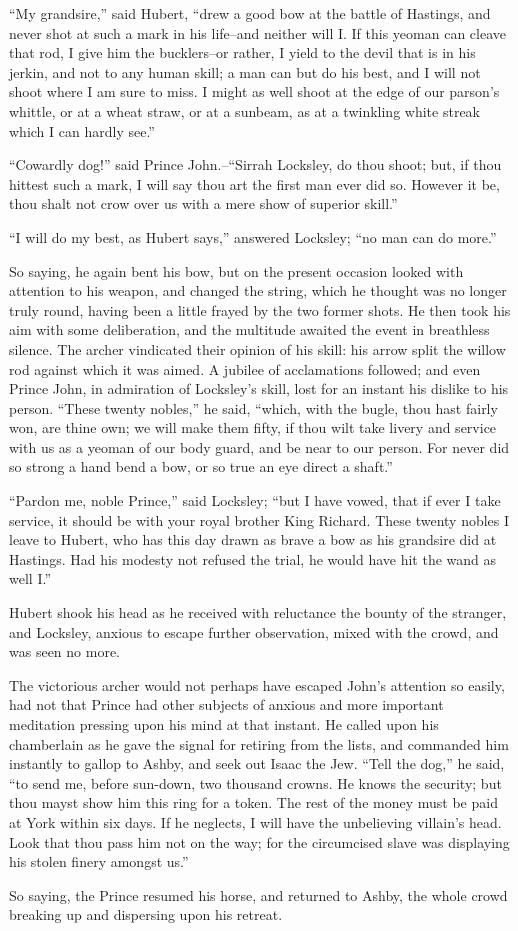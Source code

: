 ``My grandsire,'' said Hubert, ``drew a good bow at the battle of
Hastings, and never shot at such a mark in his life--and neither will I.
If this yeoman can cleave that rod, I give him the bucklers--or rather,
I yield to the devil that is in his jerkin, and not to any human skill;
a man can but do his best, and I will not shoot where I am sure to miss.
I might as well shoot at the edge of our parson's whittle, or at a wheat
straw, or at a sunbeam, as at a twinkling white streak which I can
hardly see.''

``Cowardly dog!'' said Prince John.--``Sirrah Locksley, do thou shoot;
but, if thou hittest such a mark, I will say thou art the first man ever
did so. However it be, thou shalt not crow over us with a mere show of
superior skill.''

``I will do my best, as Hubert says,'' answered Locksley; ``no man can
do more.''

So saying, he again bent his bow, but on the present occasion looked
with attention to his weapon, and changed the string, which he thought
was no longer truly round, having been a little frayed by the two former
shots. He then took his aim with some deliberation, and the multitude
awaited the event in breathless silence. The archer vindicated their
opinion of his skill: his arrow split the willow rod against which it
was aimed. A jubilee of acclamations followed; and even Prince John, in
admiration of Locksley's skill, lost for an instant his dislike to his
person. ``These twenty nobles,'' he said, ``which, with the bugle, thou
hast fairly won, are thine own; we will make them fifty, if thou wilt
take livery and service with us as a yeoman of our body guard, and be
near to our person. For never did so strong a hand bend a bow, or so
true an eye direct a shaft.''

``Pardon me, noble Prince,'' said Locksley; ``but I have vowed, that if
ever I take service, it should be with your royal brother King Richard.
These twenty nobles I leave to Hubert, who has this day drawn as brave a
bow as his grandsire did at Hastings. Had his modesty not refused the
trial, he would have hit the wand as well I.''

Hubert shook his head as he received with reluctance the bounty of the
stranger, and Locksley, anxious to escape further observation, mixed
with the crowd, and was seen no more.

The victorious archer would not perhaps have escaped John's attention so
easily, had not that Prince had other subjects of anxious and more
important meditation pressing upon his mind at that instant. He called
upon his chamberlain as he gave the signal for retiring from the lists,
and commanded him instantly to gallop to Ashby, and seek out Isaac the
Jew. ``Tell the dog,'' he said, ``to send me, before sun-down, two
thousand crowns. He knows the security; but thou mayst show him this
ring for a token. The rest of the money must be paid at York within six
days. If he neglects, I will have the unbelieving villain's head. Look
that thou pass him not on the way; for the circumcised slave was
displaying his stolen finery amongst us.''

So saying, the Prince resumed his horse, and returned to Ashby, the
whole crowd breaking up and dispersing upon his retreat.
